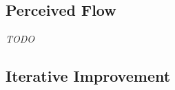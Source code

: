 




\subsection{Perceived Flow}

\emph{TODO}

%




\subsection{Iterative Improvement}
\label{sec:iterative-improvement}

